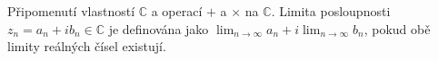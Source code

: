 Připomenutí vlastností $\mathbb{C}$ a operací $+$ a $\times$ na $\mathbb{C}$. Limita posloupnosti $z_n = a_n + i b_n \in \mathbb{C}$ je definována jako $\lim_{n \rightarrow \infty} a_n + i \lim_{n \rightarrow \infty} b_n$, pokud obě limity reálných čísel existují.